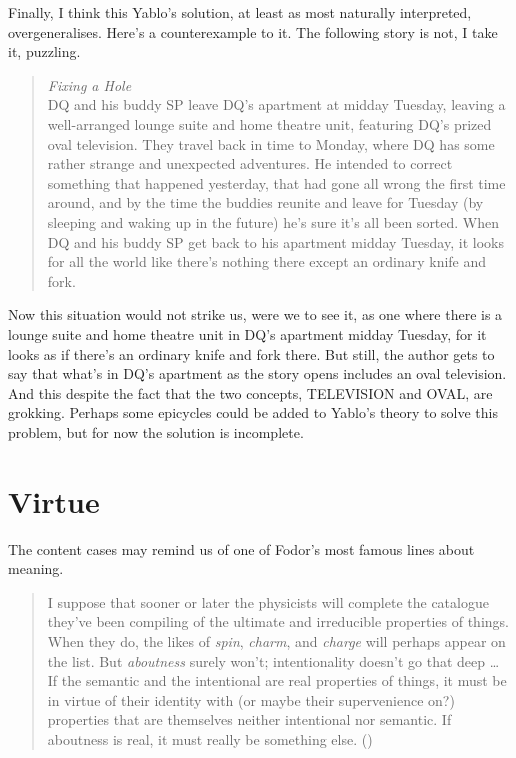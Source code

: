 \documentclass[
  11pt,
  letterpaper,
  DIV=11,
  numbers=noendperiod,
  twoside]{scrartcl}
\begin{document}
Finally, I think this Yablo's solution, at least as most naturally
interpreted, overgeneralises. Here's a counterexample to it. The
following story is not, I take it, puzzling.

\begin{quote}
\emph{Fixing a Hole}\\
DQ and his buddy SP leave DQ's apartment at midday Tuesday, leaving a
well-arranged lounge suite and home theatre unit, featuring DQ's prized
oval television. They travel back in time to Monday, where DQ has some
rather strange and unexpected adventures. He intended to correct
something that happened yesterday, that had gone all wrong the first
time around, and by the time the buddies reunite and leave for Tuesday
(by sleeping and waking up in the future) he's sure it's all been
sorted. When DQ and his buddy SP get back to his apartment midday
Tuesday, it looks for all the world like there's nothing there except an
ordinary knife and fork.
\end{quote}

Now this situation would not strike us, were we to see it, as one where
there is a lounge suite and home theatre unit in DQ's apartment midday
Tuesday, for it looks as if there's an ordinary knife and fork there.
But still, the author gets to say that what's in DQ's apartment as the
story opens includes an oval television. And this despite the fact that
the two concepts, TELEVISION and OVAL, are grokking. Perhaps some
epicycles could be added to Yablo's theory to solve this problem, but
for now the solution is incomplete.

\section{Virtue}\label{virtue}

The content cases may remind us of one of Fodor's most famous lines
about meaning.

\begin{quote}
I suppose that sooner or later the physicists will complete the
catalogue they've been compiling of the ultimate and irreducible
properties of things. When they do, the likes of \emph{spin},
\emph{charm}, and \emph{charge} will perhaps appear on the list. But
\emph{aboutness} surely won't; intentionality doesn't go that deep
\ldots{} If the semantic and the intentional are real properties of
things, it must be in virtue of their identity with (or maybe their
supervenience on?) properties that are themselves neither intentional
nor semantic. If aboutness is real, it must really be something else.
()
\end{quote}
\end{document}
